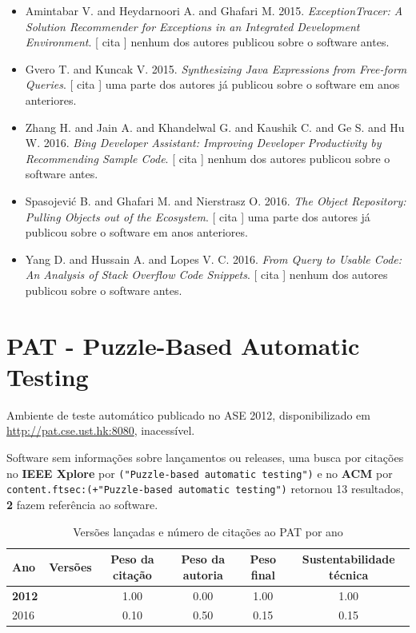 \begin{itemize}
\item Amintabar V. and Heydarnoori A. and Ghafari M.
      2015.
        \textit{ ExceptionTracer: A Solution Recommender for Exceptions in an Integrated Development Environment}.
      [
          cita
      ]
nenhum dos autores publicou sobre o software antes.
\item Gvero T. and Kuncak V.
      2015.
        \textit{ Synthesizing Java Expressions from Free-form Queries}.
      [
          cita
      ]
uma parte dos autores já publicou sobre o software em anos anteriores.
\item Zhang H. and Jain A. and Khandelwal G. and Kaushik C. and Ge S. and Hu W.
      2016.
        \textit{ Bing Developer Assistant: Improving Developer Productivity by Recommending Sample Code}.
      [
          cita
      ]
nenhum dos autores publicou sobre o software antes.
\item Spasojevi\'{c} B. and Ghafari M. and Nierstrasz O.
      2016.
        \textit{ The Object Repository: Pulling Objects out of the Ecosystem}.
      [
          cita
      ]
uma parte dos autores já publicou sobre o software em anos anteriores.
\item Yang D. and Hussain A. and Lopes V. C.
      2016.
        \textit{ From Query to Usable Code: An Analysis of Stack Overflow Code Snippets}.
      [
          cita
      ]
nenhum dos autores publicou sobre o software antes.
\end{itemize}
\section{PAT - Puzzle-Based Automatic Testing}

Ambiente de teste automático
publicado no ASE 2012,
disponibilizado em \url{http://pat.cse.ust.hk:8080},
inacessível.

Software sem informações sobre lançamentos ou releases,
uma busca por citações no {\bf IEEE Xplore} por
\texttt{("Puzzle-based automatic testing")}
e no {\bf ACM} por
\texttt{content.ftsec:(+"Puzzle-based automatic testing")}
retornou
13 resultados,
{\bf 2} fazem referência ao software.


\begin{table}[H]
\caption{Versões lançadas e número de citações ao PAT por ano}
\centering
\begin{tabular}{| l | c | c | c | c | c |}
  \hline
  Ano & Versões & Peso da citação & Peso da autoria & Peso final & Sustentabilidade técnica \\
  \hline
            {\bf 2012}
          &
          
          &
          1.00
          &
          0.00
          &
          1.00
          &
            {\color{blue} 1.00}
          \\
\hline
            2016
          &
          
          &
          0.10
          &
          0.50
          &
          0.15
          &
            {\color{red} 0.15}
          \\
\hline
\end{tabular}
\end{table}

